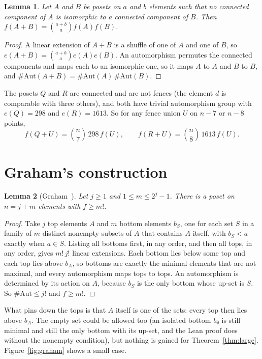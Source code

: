 \documentclass[11pt]{amsart}
\newtheorem{lemma}{Lemma}
\theoremstyle{remark}
\begin{document}
\begin{lemma}\label{lem:sum}
Let $A$ and $B$ be posets on $a$ and $b$ elements such that no connected component of $A$ is isomorphic to a connected component of $B$. Then $f(A+B)=\binom{a+b}{a}f(A)f(B)$.
\end{lemma}

\begin{proof}
A linear extension of $A+B$ is a shuffle of one of $A$ and one of $B$, so $e(A+B)=\binom{a+b}{a}e(A)e(B)$. An automorphism permutes the connected components and maps each to an isomorphic one, so it maps $A$ to $A$ and $B$ to $B$, and $\#\mathrm{Aut}(A+B)=\#\mathrm{Aut}(A)\,\#\mathrm{Aut}(B)$.
\end{proof}

The posets $Q$ and $R$ are connected and are not fences (the element $d$ is comparable with three others), and both have trivial automorphism group with $e(Q)=298$ and $e(R)=1613$. So for any fence union $U$ on $n-7$ or $n-8$ points,
\begin{equation}\label{eq:QR}
f(Q+U)=\binom n7\,298\,f(U),\qquad f(R+U)=\binom n8\,1613\,f(U).
\end{equation}

\section{Graham's construction}

\begin{lemma}[Graham~\cite{Gr}]\label{lem:graham}
Let $j\ge1$ and $1\le m\le2^j-1$. There is a poset on $n=j+m$ elements with $f\ge m!$.
\end{lemma}

\begin{proof}
Take $j$ top elements $A$ and $m$ bottom elements $b_S$, one for each set $S$ in a family of $m$ distinct nonempty subsets of $A$ that contains $A$ itself, with $b_S<a$ exactly when $a\in S$. Listing all bottoms first, in any order, and then all tops, in any order, gives $m!\,j!$ linear extensions. Each bottom lies below some top and each top lies above $b_A$, so bottoms are exactly the minimal elements that are not maximal, and every automorphism maps tops to tops. An automorphism is determined by its action on $A$, because $b_S$ is the only bottom whose up-set is $S$. So $\#\mathrm{Aut}\le j!$ and $f\ge m!$.
\end{proof}

What pins down the tops is that $A$ itself is one of the sets: every top then lies above $b_A$. The empty set could be allowed too (an isolated bottom $b_\emptyset$ is still minimal and still the only bottom with its up-set, and the Lean proof does without the nonempty condition), but nothing is gained for Theorem~\ref{thm:large}. Figure~\ref{fig:graham} shows a small case.
\end{document}
